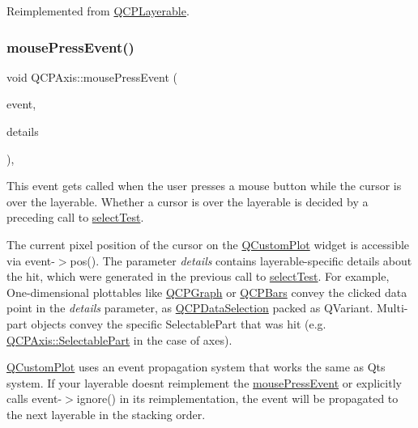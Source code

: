 Reimplemented from \hyperlink{classQCPLayerable_a9eee1ba47fd69be111059ca3881933e4}{Q\+C\+P\+Layerable}.

\mbox{\label{classQCPAxis_a61bc07cda6193a3fa6b5aa198fc4e4fa}} 
\subsubsection{\texorpdfstring{mouse\+Press\+Event()}{mousePressEvent()}}
{\footnotesize\ttfamily void Q\+C\+P\+Axis\+::mouse\+Press\+Event (\begin{DoxyParamCaption}\item[{Q\+Mouse\+Event $\ast$}]{event,  }\item[{const Q\+Variant \&}]{details }\end{DoxyParamCaption})\hspace{0.3cm}{\ttfamily [protected]}, {\ttfamily [virtual]}}

This event gets called when the user presses a mouse button while the cursor is over the layerable. Whether a cursor is over the layerable is decided by a preceding call to \hyperlink{classQCPAxis_a63b7103c57fe9acfbce164334ea837f8}{select\+Test}.

The current pixel position of the cursor on the \hyperlink{classQCustomPlot}{Q\+Custom\+Plot} widget is accessible via {\ttfamily event-\/$>$pos()}. The parameter {\itshape details} contains layerable-\/specific details about the hit, which were generated in the previous call to \hyperlink{classQCPAxis_a63b7103c57fe9acfbce164334ea837f8}{select\+Test}. For example, One-\/dimensional plottables like \hyperlink{classQCPGraph}{Q\+C\+P\+Graph} or \hyperlink{classQCPBars}{Q\+C\+P\+Bars} convey the clicked data point in the {\itshape details} parameter, as \hyperlink{classQCPDataSelection}{Q\+C\+P\+Data\+Selection} packed as Q\+Variant. Multi-\/part objects convey the specific {\ttfamily Selectable\+Part} that was hit (e.\+g. \hyperlink{classQCPAxis_abee4c7a54c468b1385dfce2c898b115f}{Q\+C\+P\+Axis\+::\+Selectable\+Part} in the case of axes).

\hyperlink{classQCustomPlot}{Q\+Custom\+Plot} uses an event propagation system that works the same as Qt\textquotesingle{}s system. If your layerable doesn\textquotesingle{}t reimplement the \hyperlink{classQCPAxis_a61bc07cda6193a3fa6b5aa198fc4e4fa}{mouse\+Press\+Event} or explicitly calls {\ttfamily event-\/$>$ignore()} in its reimplementation, the event will be propagated to the next layerable in the stacking order.

